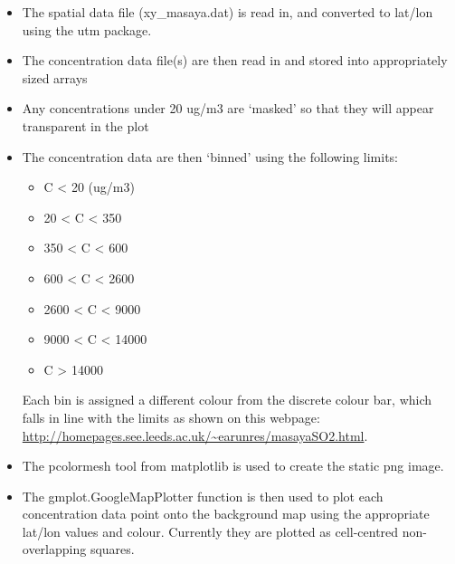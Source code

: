 \documentclass[10pt,a4paper]{article}
\begin{document}
\begin{itemize}
\item The spatial data file (xy\_masaya.dat) is read in, and converted to lat/lon using the utm package.
\item The concentration data file(s) are then read in and stored into appropriately sized arrays
\item Any concentrations under 20 ug/m3 are ‘masked’ so that they will appear transparent in the plot
\item The concentration data are then ‘binned’ using the following limits:
\begin{itemize}
\item C < 20 (ug/m3)
\item 20 < C < 350
\item 350 < C < 600
\item 600 < C < 2600
\item 2600 < C < 9000
\item 9000 < C < 14000
\item C > 14000
\end{itemize}
Each bin is assigned a different colour from the discrete colour bar, which falls in line with the limits as shown on this webpage: \url{http://homepages.see.leeds.ac.uk/~earunres/masayaSO2.html}.
\item The pcolormesh tool from matplotlib is used to create the static png image.
\item The gmplot.GoogleMapPlotter function is then used to plot each concentration data point onto the background map using the appropriate lat/lon values and colour. Currently they are plotted as cell-centred non-overlapping squares.
\end{itemize}
\end{document}
